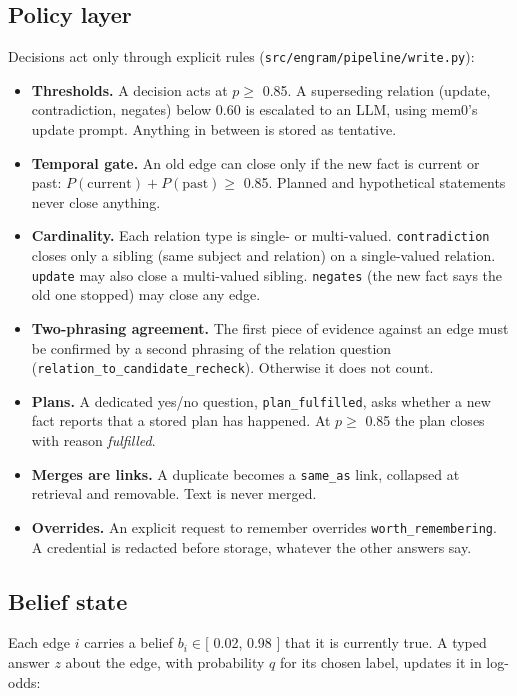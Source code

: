 \documentclass[11pt]{article}
\newcommand{\src}[1]{}
\begin{document}
\subsection{Policy layer}
Decisions act only through explicit rules (\texttt{src/engram/pipeline/write.py}):

\begin{itemize}
\item \textbf{Thresholds.} A decision acts at $p \ge$ 0.85\src{src/engram/config.py}. A superseding relation (update, contradiction, negates) below 0.60\src{src/engram/config.py} is escalated to an LLM, using mem0's update prompt. Anything in between is stored as tentative.
\item \textbf{Temporal gate.} An old edge can close only if the new fact is current or past: $P(\text{current}) + P(\text{past}) \ge$ 0.85\src{src/engram/config.py}. Planned and hypothetical statements never close anything.
\item \textbf{Cardinality.} Each relation type is single- or multi-valued. \texttt{contradiction} closes only a sibling (same subject and relation) on a single-valued relation. \texttt{update} may also close a multi-valued sibling. \texttt{negates} (the new fact says the old one stopped) may close any edge.
\item \textbf{Two-phrasing agreement.} The first piece of evidence against an edge must be confirmed by a second phrasing of the relation question (\texttt{relation\_\allowbreak{}to\_\allowbreak{}candidate\_\allowbreak{}recheck}). Otherwise it does not count.
\item \textbf{Plans.} A dedicated yes/no question, \texttt{plan\_\allowbreak{}fulfilled}, asks whether a new fact reports that a stored plan has happened. At $p \ge$ 0.85\src{src/engram/config.py} the plan closes with reason \emph{fulfilled}.
\item \textbf{Merges are links.} A duplicate becomes a \texttt{same\_\allowbreak{}as} link, collapsed at retrieval and removable. Text is never merged.
\item \textbf{Overrides.} An explicit request to remember overrides \texttt{worth\_\allowbreak{}remembering}. A credential is redacted before storage, whatever the other answers say.
\end{itemize}
\subsection{Belief state}
Each edge $i$ carries a belief $b_i \in [$ 0.02\src{src/engram/pipeline/belief.py}, 0.98\src{src/engram/pipeline/belief.py} $]$ that it is currently true. A typed answer $z$ about the edge, with probability $q$ for its chosen label, updates it in log-odds:
\end{document}
